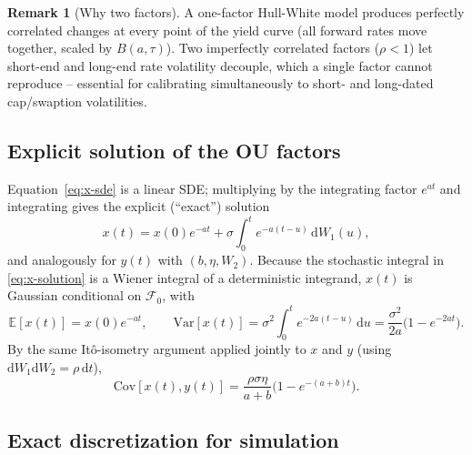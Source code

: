 \documentclass[11pt,a4paper]{article}
\newcommand{\dd}{\mathrm{d}}
\newcommand{\E}{\mathbb{E}}
\newcommand{\F}{\mathcal{F}}
\newcommand{\Var}{\mathrm{Var}}
\newcommand{\Cov}{\mathrm{Cov}}
\theoremstyle{definition}
\newtheorem{remark}{Remark}[section]
\begin{document}
\begin{remark}[Why two factors]
A one-factor Hull-White model produces perfectly correlated changes at every
point of the yield curve (all forward rates move together, scaled by
$B(a,\tau)$). Two imperfectly correlated factors ($\rho<1$) let short-end and
long-end rate volatility decouple, which a single factor cannot reproduce --
essential for calibrating simultaneously to short- and long-dated cap/swaption
volatilities.
\end{remark}

\subsection{Explicit solution of the OU factors}
\label{sec:ou-solution}

Equation~\eqref{eq:x-sde} is a linear SDE; multiplying by the integrating
factor $e^{at}$ and integrating gives the explicit (``exact'') solution
\begin{equation}
  x(t) = x(0)e^{-at} + \sigma\int_0^t e^{-a(t-u)}\,\dd W_1(u),
  \label{eq:x-solution}
\end{equation}
and analogously for $y(t)$ with $(b,\eta,W_2)$. Because the stochastic
integral in \eqref{eq:x-solution} is a Wiener integral of a deterministic
integrand, $x(t)$ is Gaussian conditional on $\F_0$, with
\[
  \E[x(t)] = x(0)e^{-at}, \qquad
  \Var[x(t)] = \sigma^2\int_0^t e^{-2a(t-u)}\,\dd u
             = \frac{\sigma^2}{2a}\bigl(1-e^{-2at}\bigr).
\]
By the same Itô-isometry argument applied jointly to $x$ and $y$ (using
$\dd W_1\dd W_2=\rho\,\dd t$),
\begin{equation}
  \Cov[x(t),y(t)] = \frac{\rho\sigma\eta}{a+b}\bigl(1-e^{-(a+b)t}\bigr).
  \label{eq:xy-cov}
\end{equation}

\subsection{Exact discretization for simulation}
\label{sec:exact-sim}
\end{document}
